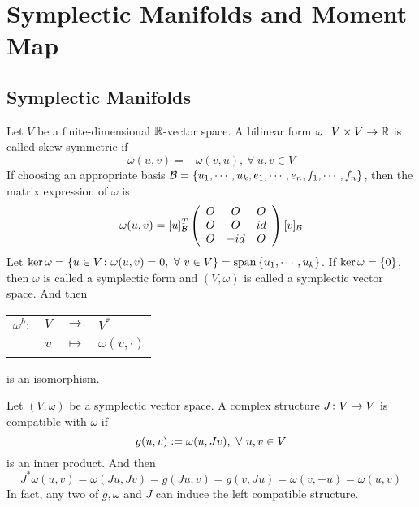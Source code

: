 \documentclass[a4paper,12pt]{article}
\newcommand{\sectionbreak}{\clearpage}
\begin{document}
	\sectionbreak
	\section{Symplectic Manifolds and Moment Map}

	\subsection{Symplectic Manifolds}

	Let $V$ be a finite-dimensional $\mathbb{R}$-vector space. A bilinear form $\omega \colon V \times V \rightarrow \mathbb{R}$ is called skew-symmetric if  
	\begin{equation*}
		\omega(u,v) =  -\omega(v,u),~\forall~u,v \in V
	\end{equation*}
	If choosing an appropriate basis $\mathcal{B}=\left\{u_1,\cdots,u_k,e_1,\cdots,e_n,f_1,\cdots,f_n\right\}$, then the matrix expression of $\omega$ is 
	\begin{equation*}
		\omega(u,v) = [u]_{\mathcal{B}}^T \left(\begin{array}{ccc}
			O & O & O \\
			O & O & id \\
			O & -id & O
		\end{array}\right)[v]_{\mathcal{B}}
	\end{equation*}
	Let $\ker \omega  = \left\{u\in V \colon \omega(u,v) = 0,~\forall~v \in V\right\} = \operatorname{span}\left\{u_1,\cdots,u_k\right\}$. If $\ker \omega = \left\{0\right\}$, then $\omega$ is called a symplectic form and $(V,\omega)$ is called a symplectic vector space. And then 
	\begin{center}
		\begin{tabular}{l c c l}
			$\omega^b \colon$ & $V$ & $\longrightarrow$ & $V^{*}$ \\
			~ & $v$ & $\longmapsto$ & $\omega(v,\cdot)$
		\end{tabular}
	\end{center}
	is an isomorphism. 

	Let $(V,\omega)$ be a symplectic vector space. A complex structure $J \colon V \rightarrow V$ is compatible with $\omega$ if 
	\begin{equation*}
		g(u,v) \vcentcolon= \omega(u,Jv),~\forall~u,v \in V
	\end{equation*}
	is an inner product. And then
	\begin{equation*}
		J^*\omega(u,v) = \omega(Ju,Jv) = g(Ju,v) = g(v,Ju) = \omega(v,-u)  = \omega(u,v)
	\end{equation*}
	In fact, any two of $g,\omega$ and $J$ can induce the left compatible structure.
\end{document}
